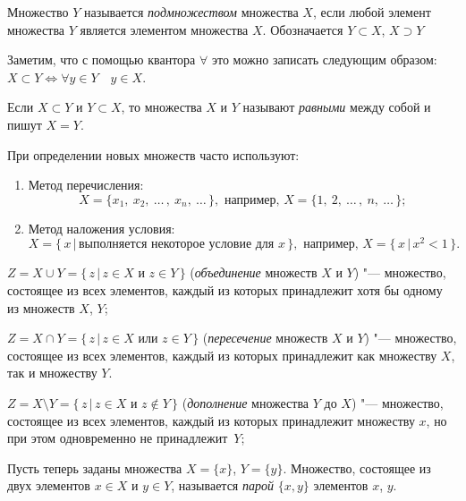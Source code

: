 \begin{defn}
Множество $Y$ называется \textit{подмножеством} множества $X$, если любой элемент множества $Y$ является элементом множества $X$. Обозначается $Y \subset X$, $X \supset Y$
\end{defn}

Заметим, что с помощью квантора $\forall$ это можно записать следующим образом: $X \subset Y \Leftrightarrow \forall y\in Y\quad  y\in X$. 

\begin{defn}
Если $X \subset Y$ и $Y \subset X$, то множества $X$ и $Y$ называют \textit{равными} между собой и пишут $X = Y$.
\end{defn}


При определении новых множеств часто используют:
\begin{enumerate}[wide, labelwidth=!, noitemsep]
\item 
Метод перечисления: 
$$
X = \{x_1,\ x_2,\ \dots\,,\ x_n,\ \dots\, \}, \text{ например, }
X = \{1,\ 2,\ \dots\,,\ n,\ \dots\, \};
$$
\item Метод наложения условия: 
$$
X = \{\, x\,\big|\, \text{выполняется некоторое условие для $x$}\,\}, \text{ например, }
X = \{\, x\,\big| \,x^2 < 1\,\}.
$$
\end{enumerate}

\begin{defn}
$Z = X \cup Y = \{\,z\,\big|\, z\in X \text{ и } z\in Y\,\}$ (\textit{объединение} множеств $X$ и $Y$) "--- множество, состоящее из всех элементов, каждый из которых принадлежит хотя бы одному из множеств $X$, $Y$;
\end{defn}
\begin{defn}
$Z = X \cap Y = \{\,z\,\big|\, z\in X \text{ или } z\in Y\,\}$ (\textit{пересечение} множеств $X$ и $Y$) "--- множество, состоящее из всех элементов, каждый из которых принадлежит как множеству $X$, так и множеству $Y$.
\end{defn}
\begin{defn}
$Z =X \setminus Y = \{\,z\,\big|\, z\in X \text{ и } z\notin Y\,\}$ (\textit{дополнение} множества $Y$ до $X$) "--- множество, состоящее из всех элементов, каждый из которых принадлежит множеству $x$, но при этом одновременно не принадлежит~$Y$;
\end{defn}

\begin{defn}
Пусть теперь заданы множества $X= \{x\}$, $Y = \{y\}$. Множество, состоящее из двух элементов $x\in X$ и $y\in Y$, называется \textit{парой} $\{x,y\}$ элементов $x$, $y$. 
\end{defn}


